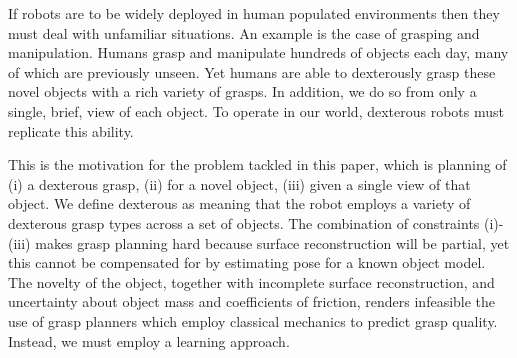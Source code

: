 If robots are to be widely deployed in human populated environments then they must deal with unfamiliar situations. An example is the case of grasping and manipulation. Humans grasp and manipulate hundreds of objects each day, many of which are previously unseen. Yet humans are able to dexterously grasp these novel objects with a rich variety of grasps. In addition, we do so from only a single, brief, view of each object. To operate in our world, dexterous robots must replicate this ability.

This is the motivation for the problem tackled in this paper, which is planning of (i) a dexterous grasp, (ii) for a novel object, (iii) given a single view of that object. We define dexterous as meaning that the robot employs a variety of dexterous grasp types across a set of objects. The combination of constraints (i)-(iii) makes grasp planning hard because surface reconstruction will be partial, yet this cannot be compensated for by estimating pose for a known object model. The novelty of the object, together with incomplete surface reconstruction, and uncertainty about object mass and coefficients of friction, renders infeasible the use of grasp planners which employ classical mechanics to predict grasp quality. Instead, we must employ a learning approach.

